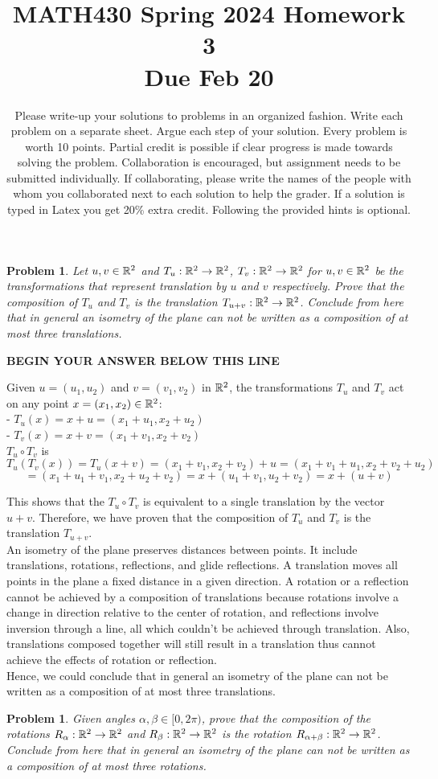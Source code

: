\documentclass[letter,12pt]{article}
\title{MATH430 Spring 2024 Homework 3 \vspace{0.1in}\\  \normalsize{Due Feb 20} \vspace{-0.3in}}
\date{\small{Please write-up your solutions to problems in an organized fashion. Write each problem on a separate sheet. Argue each step of your solution. Every problem is worth 10 points. Partial credit is possible if clear progress is made towards solving the problem. Collaboration is encouraged, but assignment needs to be submitted individually.
If collaborating, please write the names of the people with whom you collaborated next to each solution to help the grader. If a solution is typed in Latex you get 20\% extra credit. Following the provided hints is optional.}}
\newtheorem{problem}[main_theorem]{Problem}
\newcommand{\answerspacetop}{
	\begin{center}
		\textbf{BEGIN YOUR ANSWER BELOW THIS LINE} \\ \hrulefill
	\end{center}
}
\begin{document}
\maketitle



\begin{problem} Let $u,v \in \Bbb R^2$ and $T_u:\Bbb R^2 \to \Bbb R^2$, $T_{v}:\Bbb R^2 \to \Bbb R^2$ for $u,v \in \Bbb R^2$ be the transformations that represent translation by $u$ and $v$ respectively. Prove that the composition of $T_u$ and $T_v$ is the translation $T_{u+v}:\Bbb R^2 \to \Bbb R^2$. Conclude from here that in general an isometry of the plane can not be written as a composition of at most three translations.
\end{problem}
\answerspacetop
Given $u = (u_1, u_2)$ and $v = (v_1, v_2)$ in $\Bbb R^2$, the transformations $T_u$ and $T_v$ act on any point $x = (x_1, x_2) \in \Bbb R^2$:\\
- $T_u(x) = x + u = (x_1 + u_1, x_2 + u_2)$\\
- $T_v(x) = x + v = (x_1 + v_1, x_2 + v_2)$\\

$T_u \circ T_v$ is
$$T_u(T_v(x)) = T_u(x + v) = (x_1 + v_1, x_2 + v_2) + u = (x_1 + v_1 + u_1, x_2 + v_2 + u_2)$$
$$= (x_1 + u_1 + v_1, x_2 + u_2 + v_2) = x + (u_1 + v_1, u_2 + v_2) = x + (u + v)$$

This shows that the $T_u \circ T_v$ is equivalent to a single translation by the vector $u + v$. Therefore, we have proven that the composition of $T_u$ and $T_v$ is the translation $T_{u+v}$.\\

An isometry of the plane preserves distances between points. It include translations, rotations, reflections, and glide reflections. A translation moves all points in the plane a fixed distance in a given direction. A rotation or a reflection cannot be achieved by a composition of translations because rotations involve a change in direction relative to the center of rotation, and reflections involve inversion through a line, all which couldn't be achieved through translation. Also, translations composed together will still result in a translation thus cannot achieve the effects of rotation or reflection.\\

Hence, we could conclude that in general an isometry of the plane can not be written as a composition of at most three translations.
\pagebreak

\begin{problem} Given angles $\alpha,\beta \in [0,2\pi)$, prove that the composition of the rotations $R_{\alpha}:\Bbb R^2 \to \Bbb R^2$ and $R_{\beta}:\Bbb R^2 \to \Bbb R^2$ is the rotation $R_{\alpha+\beta}:\Bbb R^2 \to \Bbb R^2$. Conclude from here that in general an isometry of the plane can not be written as a composition of at most three rotations.
\end{problem}
\end{document}
